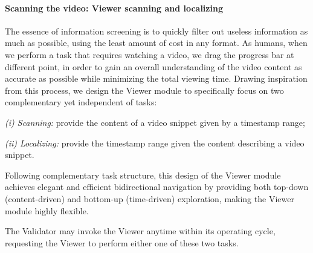 \paragraph{Scanning the video: Viewer scanning and localizing} 

The essence of information screening is to quickly filter out useless information as much as possible, using the least amount of cost in any format. As humans, when we perform a task that requires watching a video, we drag the progress bar at different point, in order to gain an overall understanding of the video content as accurate as possible while minimizing the total viewing time. Drawing inspiration from this process, we design the Viewer module to specifically focus on two complementary yet independent of tasks: 

\textit{(i) Scanning:} provide the content of a video snippet given by a timestamp range;

\textit{(ii) Localizing:} provide the timestamp range given the content describing a video snippet.

Following complementary task structure, this design of the Viewer module achieves elegant and efficient bidirectional navigation by providing both top-down (content-driven) and bottom-up (time-driven) exploration, making the Viewer module highly flexible.

The Validator may invoke the Viewer anytime within its operating cycle, requesting the Viewer to perform either one of these two tasks.  

